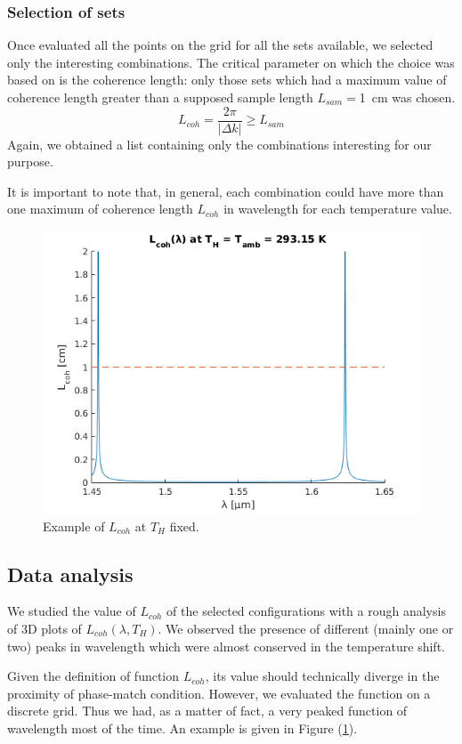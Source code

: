 \documentclass[12pt,a4paper,twoside]{article}
\begin{document}
\subsubsection{Selection of sets}
Once evaluated all the points on the grid for all the sets available, we selected only the interesting combinations.
The critical parameter on which the choice was based on is the coherence length: only those sets which had a maximum value of coherence length greater than a supposed sample length $L_{sam} = $\SI{1}{\cm} was chosen.
\begin{equation}
	L_{coh} = \frac{2\pi}{|\Delta k|} \geq L_{sam}
	\label{eq_lcoh_crit}
\end{equation}
Again, we obtained a list containing only the combinations interesting for our purpose.

It is important to note that, in general, each combination could have more than one maximum of coherence length $L_{coh}$ in wavelength for each temperature value.

\begin{figure}[!h]
	\centering
	\includegraphics[width=.75\textwidth]{delta_example.png}
	\caption{Example of $L_{coh}$ at $T_H$ fixed.}
	\label{fig_peaks}
\end{figure}

\subsection{Data analysis}
We studied the value of $L_{coh}$ of the selected configurations with a rough analysis of 3D plots of $L_{coh}(\lambda,T_{H})$.
We observed the presence of different (mainly one or two) peaks in wavelength which were almost conserved in the temperature shift.

Given the definition of function $L_{coh}$, its value should technically diverge in the proximity of phase-match condition.
However, we evaluated the function on a discrete grid.
Thus we had, as a matter of fact, a very peaked function of wavelength most of the time.
An example is given in Figure (\ref{fig_peaks}).
\end{document}
